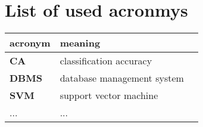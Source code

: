 \chapter*{List of used acronmys}

\begin{tabular}{l|l|l}
  {\bf acronym} & {\bf meaning}  \\ \hline
  {\bf CA} & classification accuracy \\
  {\bf DBMS} & database management system \\
  {\bf SVM} & support vector machine \\
  ... & ... \\
\end{tabular}